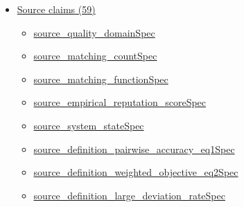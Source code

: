 \documentclass[10pt]{article}
\begin{document}
\begin{itemize}[leftmargin=1.2em]
\begin{itemize}[leftmargin=1.2em]
\item \hyperlink{library-prerequisite-04fdd75df8db4e26}{EconCSLib.Probability.twoSampleScoreGapTieProb}
\item \hyperlink{library-prerequisite-ba4c2212912ca97d}{EconCSLib.Probability.twoSamplePkComplementErrorProb}
\item \hyperlink{library-prerequisite-94bd3b0a19bf1178}{EconCSLib.Probability.twoSampleFloorPkComplementErrorProb}
\item \hyperlink{library-prerequisite-11866f137653a75d}{EconCSLib.Probability.weightedBernoulliFailureBase}
\item \hyperlink{library-prerequisite-ffca3d1e44838990}{EconCSLib.Probability.weightedBernoulliSuccessBase}
\item \hyperlink{library-prerequisite-2d3d970688daf0d7}{EconCSLib.Probability.weightedBernoulliClosedRateBase}
\item \hyperlink{library-prerequisite-c3cc92a498459481}{EconCSLib.Probability.weightedBernoulliClosedThresholdRate}
\item \hyperlink{library-prerequisite-ecc26a3133fdd38b}{EconCSLib.finiteMax}
\item \hyperlink{library-prerequisite-087e3287a5c76915}{EconCSLib.finiteMin}
\item \hyperlink{library-prerequisite-dae3217c424b40b2}{EconCSLib.strictUpperPairSet}
\end{itemize}
\item \hyperlink{source-section-f10b5f68e4acf3dc}{Source claims (59)}
\begin{itemize}[leftmargin=1.2em]
\item \hyperlink{source-claim-d4f7ad79732f053c}{source\_quality\_domainSpec}
\item \hyperlink{source-claim-7979c322a62ef2c2}{source\_matching\_countSpec}
\item \hyperlink{source-claim-62613dce8c1c3874}{source\_matching\_functionSpec}
\item \hyperlink{source-claim-ad2abdefec264024}{source\_empirical\_reputation\_scoreSpec}
\item \hyperlink{source-claim-ab291bf70e6ff37c}{source\_system\_stateSpec}
\item \hyperlink{source-claim-b8da8ea96b79a0b8}{source\_definition\_pairwise\_accuracy\_eq1Spec}
\item \hyperlink{source-claim-88670d8e30834161}{source\_definition\_weighted\_objective\_eq2Spec}
\item \hyperlink{source-claim-55d3b1e0bb545f86}{source\_definition\_large\_deviation\_rateSpec}

\end{itemize}
\end{itemize}
\end{document}
